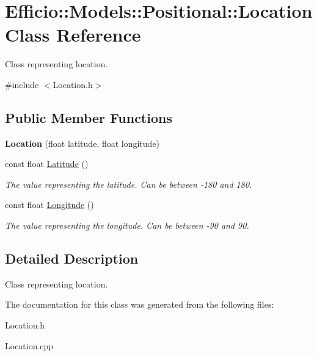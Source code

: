 \hypertarget{class_efficio_1_1_models_1_1_positional_1_1_location}{}\section{Efficio\+:\+:Models\+:\+:Positional\+:\+:Location Class Reference}
\label{class_efficio_1_1_models_1_1_positional_1_1_location}


Class representing location.  




{\ttfamily \#include $<$Location.\+h$>$}

\subsection*{Public Member Functions}
\begin{DoxyCompactItemize}
\item 
{\bfseries Location} (float latitude, float longitude)\hypertarget{class_efficio_1_1_models_1_1_positional_1_1_location_a34b228ac345ab8da3a7e0d15386facab}{}\label{class_efficio_1_1_models_1_1_positional_1_1_location_a34b228ac345ab8da3a7e0d15386facab}

\item 
const float \hyperlink{class_efficio_1_1_models_1_1_positional_1_1_location_a4a26a3886c2089d29ab5ec4a38a17d79}{Latitude} ()\hypertarget{class_efficio_1_1_models_1_1_positional_1_1_location_a4a26a3886c2089d29ab5ec4a38a17d79}{}\label{class_efficio_1_1_models_1_1_positional_1_1_location_a4a26a3886c2089d29ab5ec4a38a17d79}

\begin{DoxyCompactList}\small\item\em The value representing the latitude. Can be between -\/180 and 180. \end{DoxyCompactList}\item 
const float \hyperlink{class_efficio_1_1_models_1_1_positional_1_1_location_a8e80c02b65a36109096bd1b3828ab0de}{Longitude} ()\hypertarget{class_efficio_1_1_models_1_1_positional_1_1_location_a8e80c02b65a36109096bd1b3828ab0de}{}\label{class_efficio_1_1_models_1_1_positional_1_1_location_a8e80c02b65a36109096bd1b3828ab0de}

\begin{DoxyCompactList}\small\item\em The value representing the longitude. Can be between -\/90 and 90. \end{DoxyCompactList}\end{DoxyCompactItemize}


\subsection{Detailed Description}
Class representing location. 

The documentation for this class was generated from the following files\+:\begin{DoxyCompactItemize}
\item 
Location.\+h\item 
Location.\+cpp\end{DoxyCompactItemize}
